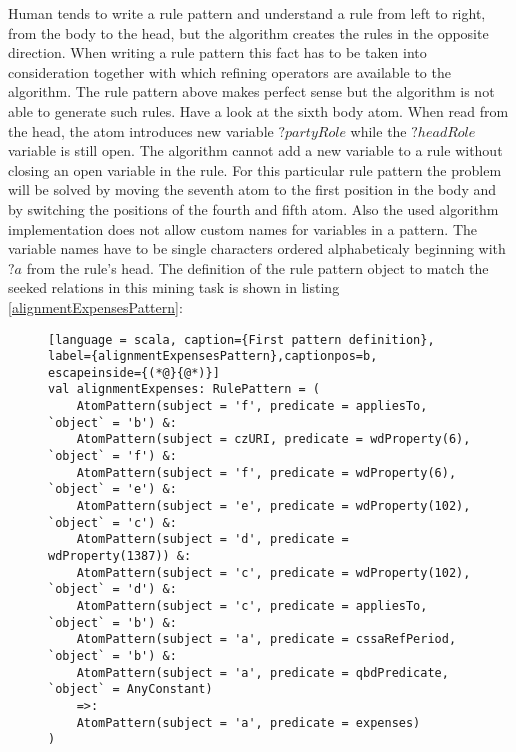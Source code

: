 Human tends to write a rule pattern and understand a rule from left to right, from the body to the head, but the algorithm creates the rules in the opposite direction. When writing a rule pattern this fact has to be taken into consideration together with which refining operators are available to the algorithm. The rule pattern above makes perfect sense but the algorithm is not able to generate such rules. Have a look at the sixth body atom. When read from the head, the atom introduces new variable $?partyRole$ while the $?headRole$ variable is still open. The algorithm cannot add a new variable to a rule without closing an open variable in the rule. For this particular rule pattern the problem will be solved by moving the seventh atom to the first position in the body and by switching the positions of the fourth and fifth atom. Also the used algorithm implementation does not allow custom names for variables in a pattern. The variable names have to be single characters ordered alphabeticaly beginning with $?a$ from the rule's head. The definition of the rule pattern object to match the seeked relations in this mining task is shown in listing \ref{alignmentExpensesPattern}:

\begin{figure}[h]
\begin{lstlisting}[language = scala, caption={First pattern definition}, label={alignmentExpensesPattern},captionpos=b, escapeinside={(*@}{@*)}]
val alignmentExpenses: RulePattern = (
    AtomPattern(subject = 'f', predicate = appliesTo, `object` = 'b') &:
    AtomPattern(subject = czURI, predicate = wdProperty(6), `object` = 'f') &:
    AtomPattern(subject = 'f', predicate = wdProperty(6), `object` = 'e') &:
    AtomPattern(subject = 'e', predicate = wdProperty(102), `object` = 'c') &:  
    AtomPattern(subject = 'd', predicate = wdProperty(1387)) &:
    AtomPattern(subject = 'c', predicate = wdProperty(102), `object` = 'd') &:
    AtomPattern(subject = 'c', predicate = appliesTo, `object` = 'b') &:
    AtomPattern(subject = 'a', predicate = cssaRefPeriod, `object` = 'b') &:
    AtomPattern(subject = 'a', predicate = qbdPredicate, `object` = AnyConstant)
    =>:
    AtomPattern(subject = 'a', predicate = expenses)
)
\end{lstlisting}
\end{figure}

